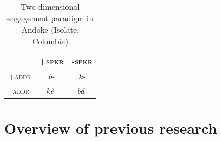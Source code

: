 \begin{table}[t]
\centering

\caption{Two-dimensional engagement paradigm in Andoke (Isolate, Colombia) \cite[115-116]{EvansBergqvistSanRoque2018a}}
    \begin{tabular}{c|c|c}
         & \textsc{+spkr} & \textsc{-spkr} \\
         \hline
        \textsc{+addr} & \textit{b-} & \textit{k-} \\
        \hline
        \textsc{-addr} & \textit{kẽ-} & \textit{bã-} \\
    \end{tabular}

\label{tab:EngagementAndoke}
\end{table}

\section{Overview of previous research}
